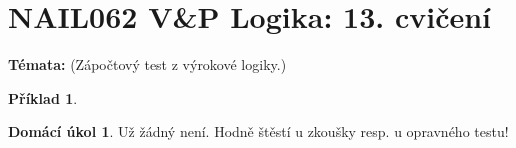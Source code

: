 \documentclass[a4paper]{article}
\theoremstyle{definition}
\newtheorem{problem}{Příklad}
\newtheorem*{ukol}{Domácí úkol}
\begin{document}
\section*{NAIL062 V\&P Logika: 13. cvičení}


\textbf{Témata:}
(Zápočtový test z výrokové logiky.)


\medskip\begin{problem}
 
\end{problem}


\medskip\begin{ukol}
Už žádný není. Hodně štěstí u zkoušky resp. u opravného testu!
\end{ukol}
\end{document}
